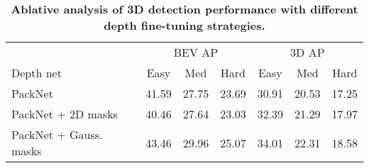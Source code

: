 
\begin{table}[t!]
\centering
{
\footnotesize
\setlength{\tabcolsep}{0.4em}
\begin{tabular}{l|ccc|ccc}
\toprule
& \multicolumn{3}{c}{BEV AP} & \multicolumn{3}{c}{3D AP} \\ 
\multirow{-2}{*}{Depth net}& 
Easy & 
Med &
Hard &
Easy & Med & Hard \vspace{0.5mm}\\
\midrule
PackNet & 
41.59 & 
27.75 &
23.69 &
30.91 &
20.53 &
17.25
\\
PackNet + 2D masks  & 
40.46 & 
27.64 & 
23.03 &
32.39 &
21.29 & 
17.97 
\\

PackNet + Gauss. masks &
43.46 &
29.96 &
25.07 &
34.01 &
22.31 &
18.58 
\\



\bottomrule
\end{tabular}\\\vspace{0mm}
\caption{
\textbf{Ablative analysis of 3D detection performance with different depth fine-tuning strategies.}}
\label{table:baseline_depth_detection}
}
\end{table}